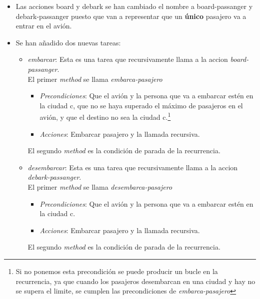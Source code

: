\documentclass[10pt,spanish]{article}
\begin{document}
	\begin{itemize}
		\item Las acciones board y debark se han cambiado el nombre a board-passanger y debark-passanger puesto que van a representar que un \textbf{único} pasajero va a entrar en el avión. 
		\item Se han añadido dos nuevas tareas: 
		\begin{itemize}
			\item \textit{embarcar}: Esta es una tarea que recursivamente llama a la accion \textit{board-passanger}.\\
			El primer \textit{method} se llama \textit{embarca-pasajero}\\
			\begin{itemize}
				\item \textit{Precondiciones}: Que el avión y la persona que va a embarcar estén en la ciudad c, que no se haya superado el máximo de pasajeros en el avión, y que el destino no sea la ciudad c.\footnote{Si no ponemos esta precondición se puede producir un bucle en la recurrencia, ya que cuando los pasajeros desembarcan en una ciudad y hay no se supera el limite, se cumplen las precondiciones de \textit{embarca-pasajero}}
				\item \textit{Acciones}: Embarcar pasajero y la llamada recursiva. 
			\end{itemize}
		El segundo \textit{method} es la condición de parada de la recurrencia.\\
		\item \textit{desembarcar}: Esta es una tarea que recursivamente llama a la accion \textit{debark-passanger}.\\
		El primer \textit{method} se llama \textit{desembarca-pasajero}\\
		\begin{itemize}
			\item \textit{Precondiciones}: Que el avión y la persona que va a embarcar estén en la ciudad c.
			\item \textit{Acciones}: Embarcar pasajero y la llamada recursiva. 
		\end{itemize}
		El segundo \textit{method} es la condición de parada de la recurrencia.\\
		\end{itemize}
	\end{itemize}
\end{document}
